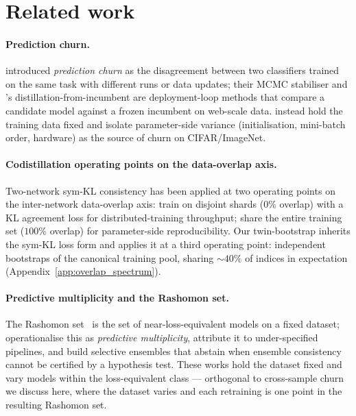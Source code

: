 \section{Related work}
\label{sec:related}

\paragraph{Prediction churn.}
\citet{launch_and_iterate} introduced \emph{prediction churn} as the
disagreement between two classifiers trained on the same task with
different runs or data updates; their MCMC stabiliser and
\citet{jiang2022}'s distillation-from-incumbent are deployment-loop
methods that compare a candidate model against a frozen incumbent on
web-scale data.  \citet{bhojanapalli2021reproducibility} instead
hold the training data fixed and isolate parameter-side variance
(initialisation, mini-batch order, hardware) as the source of
churn on CIFAR/ImageNet.

\paragraph{Codistillation operating points on the data-overlap axis.}
Two-network sym-KL consistency has been applied at two operating
points on the inter-network data-overlap axis:
\citet{anil2018large} train on disjoint shards ($0\%$ overlap) with
a KL agreement loss for distributed-training throughput;
\citet{bhojanapalli2021reproducibility} share the entire training
set ($100\%$ overlap) for parameter-side reproducibility.
Our twin-bootstrap inherits the sym-KL loss form and applies it at a
third operating point: independent bootstraps of the canonical
training pool, sharing ${\sim}40\%$ of indices in expectation
(Appendix~\ref{app:overlap_spectrum}).

\paragraph{Predictive multiplicity and the Rashomon set.}
The Rashomon set~\citep{Breiman2001} is the set of near-loss-equivalent
models on a fixed dataset; \citet{marx2020} operationalise this as
\emph{predictive multiplicity}, \citet{damour2022} attribute it to
under-specified pipelines, and \citet{black2022} build selective
ensembles that abstain when ensemble consistency cannot be certified
by a hypothesis test.  These works hold the dataset fixed and vary
models within the loss-equivalent class --- orthogonal to
cross-sample churn we discuss here, where the dataset varies and each retraining
is one point in the resulting Rashomon set.

